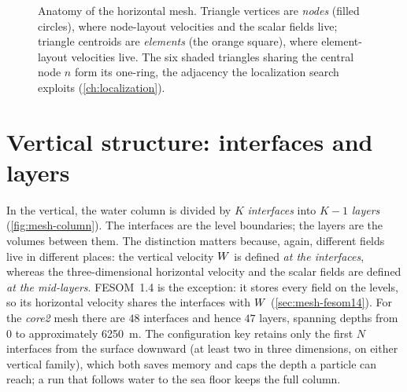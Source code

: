\begin{figure}[t]
\centering
{}
\caption{Anatomy of the horizontal mesh. Triangle vertices are \emph{nodes}
(filled circles), where node-layout velocities and the scalar fields live; triangle
centroids are \emph{elements} (the orange square), where element-layout velocities
live. The six shaded triangles sharing the central node $n$ form its one-ring, the
adjacency the localization search exploits (\cref{ch:localization}).}
\label{fig:mesh-anatomy}
\end{figure}

\section{Vertical structure: interfaces and layers}\label{sec:mesh-vertical}

In the vertical, the water column is divided by $K$ \emph{interfaces} into $K-1$
\emph{layers} (\cref{fig:mesh-column}).  The
interfaces are the level boundaries; the layers are the volumes between them. The
distinction matters because, again, different fields live in different places: the
vertical velocity $W$ is defined \emph{at the interfaces}, whereas the
three-dimensional horizontal velocity and the scalar fields are defined \emph{at
the mid-layers}. FESOM~1.4 is the exception: it stores every field on the levels, so its horizontal
velocity shares the interfaces with $W$ (\cref{sec:mesh-fesom14}). For the \emph{core2} mesh there are $48$ interfaces and hence $47$
layers, spanning depths from $0$ to approximately \SI{6250}{\metre}. The
configuration key  retains only the first $N$ interfaces from the
surface downward (at least two in three dimensions, on either vertical family), which both saves memory
and caps the depth a particle can reach; a run that follows water to the sea floor keeps the full
column.

